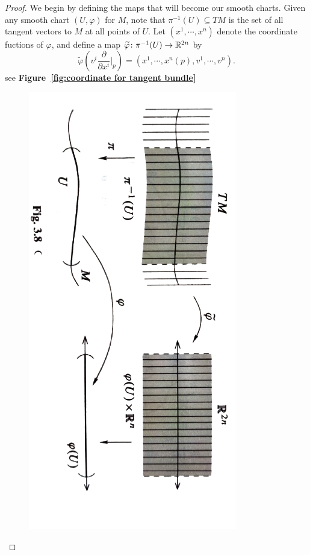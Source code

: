 \begin{proof}
    We begin by defining the maps that will become our smooth charts. Given any smooth chart $(U,\varphi)$ for $M$, note that $\pi^{-1}(U)\subseteq TM$ is the set of all tangent vectors to $M$ at all points of $U$. Let $(x^1,\cdots,x^n)$ denote the coordinate fuctions of $\varphi$, and define a map $\widetilde{\varphi}\colon \pi^{-1}(U)\to \mathbb{R}^{2n}$ by
    \begin{equation}
    \label{eq:natural coordinates on TM}\widetilde{\varphi}\left(v^i\frac{\partial}{\partial x^i}\bigg|_p\right)=(x^1,\cdots,x^n(p),v^1,\cdots,v^n).
    \end{equation}
    see \textbf{Figure~\ref{fig:coordinate for tangent bundle}}
    \begin{figure}[h]
        \centering
        \includegraphics[angle=90,width=.7\linewidth]{figures/fog3.8.png}

\end{figure}
\end{proof}
